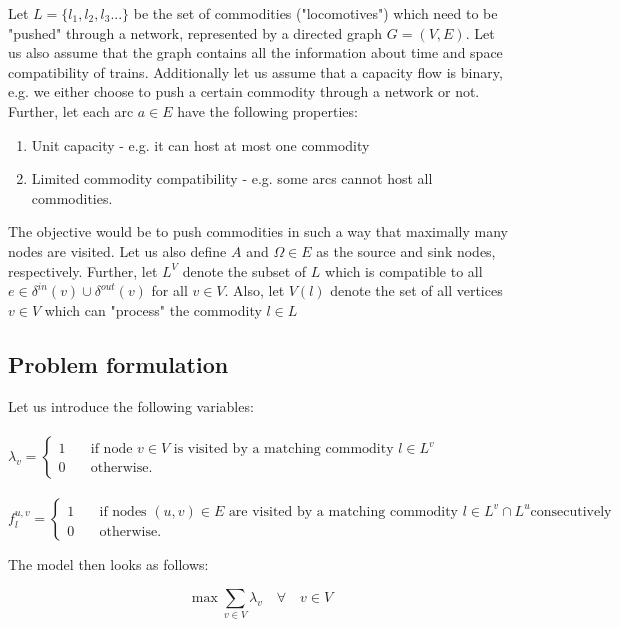 Let $L = \{l_1, l_2, l_3 ... \}$ be the set of commodities ("locomotives") which need to be "pushed" through a network, represented by a directed graph $G = (V, E)$. Let us also assume that the graph contains all the information about time and space compatibility of trains. 
Additionally let us assume that a capacity flow is binary, e.g. we either choose to push a certain commodity through a network or not.
Further, let each arc $a \in E$ have the following properties:
\begin{enumerate}
    \item Unit capacity - e.g. it can host at most one commodity
    \item Limited commodity compatibility - e.g. some arcs cannot host all commodities.
\end{enumerate}
The objective would be to push commodities in such a way that maximally many nodes are visited.
Let us also define $A$ and $\Omega \in E$ as the source and sink nodes, respectively. Further, let $L^V$ denote the subset of $L$ which is compatible to all $e \in \delta^{in}(v) \cup \delta^{out}(v)$ for all $v \in V$. Also, let $V(l)$ denote the set of all vertices $v \in V$ which can "process" the commodity $l \in L$
\subsection{Problem formulation}
Let us introduce the following variables:
\\
\\
$\lambda_v = \begin{cases}
    1  & \quad \text{if node } v \in V \text{ is visited by a matching commodity } l \in L^v \\
    0  & \quad \text{otherwise.}
  \end{cases}$
\\
\\
$f^{u, v}_l = \begin{cases}
    1  & \quad \text{if nodes } (u, v) \in E \text{ are visited by a matching commodity } l \in L^v \cap L^u \text{consecutively} \\
    0  & \quad \text{otherwise.}
  \end{cases}$ 
\newline

The model then looks as follows:
\newline
\newline

\begin{equation}
	\label{eqn:old_obj}
    \displaystyle \max   \displaystyle  \sum_{v\in V} \lambda_{v} \quad \forall \quad v \in V
\end{equation}
 
